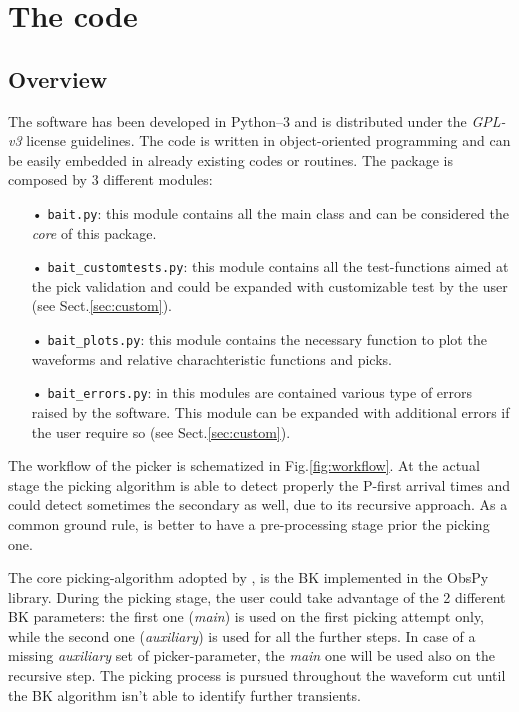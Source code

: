 \documentclass[11pt,a4paper,twocolumns]{article}
\begin{document}
\section{The code}
\subsection{Overview}
The \bait software has been developed in Python--3 and is distributed under the \emph{GPL-v3} license guidelines.
The code is written in object-oriented programming and can be easily embedded in already existing codes or routines. The package is composed by 3 different modules:
\begin{itemize}
\item[•] \texttt{bait.py}: this module contains all the main \bait class and can be considered the \emph{core} of this package.
\item[•] \texttt{bait\_customtests.py}: this module contains all the test-functions aimed at the pick validation and could be expanded with customizable test by the user (see Sect.\ref{sec:custom}).
\item[•] \texttt{bait\_plots.py}: this module contains the necessary function to plot the waveforms and relative \bait charachteristic functions and picks.
\item[•] \texttt{bait\_errors.py}: in this modules are contained various type of errors raised by the software. This module can be expanded with additional errors if the user require so (see Sect.\ref{sec:custom}).
\end{itemize}

The workflow of the picker is schematized in Fig.\ref{fig:workflow}. At the actual stage the \bait picking algorithm is able to detect properly the P-first arrival times and could detect sometimes the secondary as well, due to its recursive approach. As a common ground rule, is better to have a pre-processing stage prior the picking one.

The core picking-algorithm adopted by \bait, is the BK implemented in the ObsPy library. During the picking stage, the user could take advantage of the 2 different BK parameters: the first one (\emph{main}) is used on the first picking attempt only, while the second one (\emph{auxiliary}) is used for all the further steps.
In case of a missing \emph{auxiliary} set of picker-parameter, the \emph{main} one will be used also on the recursive step. The picking process is pursued throughout the waveform cut until the BK algorithm isn't able to identify further transients.
\end{document}
